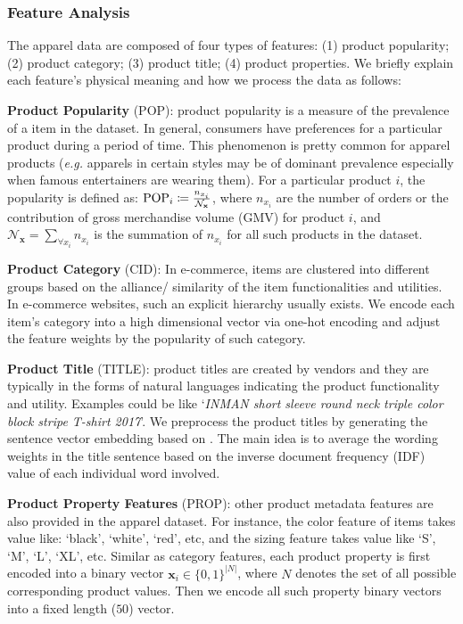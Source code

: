 \subsubsection{Feature Analysis}
The apparel data are composed of four types of features: (1) product popularity; (2) product category; (3) product title; (4) product properties.  We briefly explain each feature's physical meaning and how we process the data as follows:

\textbf{Product Popularity} (POP): product popularity is a measure of the prevalence of a item in the dataset. In general, consumers have preferences for a particular product during a period of time. This phenomenon is pretty common for apparel products (\emph{e.g.} apparels in certain styles may be of dominant prevalence especially when famous entertainers are wearing them). For a particular product $i$, the popularity is defined as: $\mathrm{\scriptsize POP}_{i} \coloneqq \frac{n_{x_i}}{\mathcal{N}_\mathbf{x}}$, where $n_{x_i}$ are the number of orders or the contribution of gross merchandise volume (GMV) for product $i$,  and $\mathcal{N}_\mathbf{x} = \sum_{\forall x_i}n_{x_i}$ is the summation of $n_{x_i}$ for all such products in the dataset. \newline

\textbf{Product Category} (CID): In e-commerce, items are clustered into different groups based on the alliance/ similarity of the item functionalities and utilities.  In e-commerce websites, such an explicit hierarchy usually exists.  We encode each item's category into a high dimensional vector via one-hot encoding and adjust the feature weights by the popularity of such category. \newline

\textbf{Product Title} (TITLE): product titles are created by vendors and they are typically in the forms of natural languages indicating the product functionality and utility.  Examples could be like `\emph{INMAN short sleeve round neck triple color block stripe T-shirt 2017}'.  We preprocess the product titles by generating the sentence vector embedding based on \cite{de2016representation}.  The main idea is to average the wording weights in the title sentence based on the inverse document frequency (IDF) value of each individual word involved. \newline

\textbf{Product Property Features} (PROP): other product metadata features are also provided in the apparel dataset. For instance, the color feature of items takes value like: `black', `white', `red', etc, and the sizing feature takes value like `S', `M', `L', `XL', etc.  Similar as category features, each product property is first encoded into a binary vector $\bm{x}_i \in \{0, 1\}^{|N|}$, where $N$ denotes the set of all possible corresponding product values.  Then we encode all such property binary vectors into a fixed length ($50$) vector. \newline

